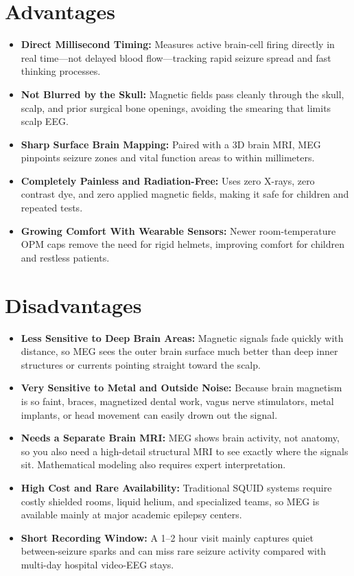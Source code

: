 \section{Advantages}
\begin{itemize}
  \item \textbf{Direct Millisecond Timing:} Measures active brain-cell firing directly in real time---not delayed blood flow---tracking rapid seizure spread and fast thinking processes.
  \item \textbf{Not Blurred by the Skull:} Magnetic fields pass cleanly through the skull, scalp, and prior surgical bone openings, avoiding the smearing that limits scalp EEG.
  \item \textbf{Sharp Surface Brain Mapping:} Paired with a 3D brain MRI, MEG pinpoints seizure zones and vital function areas to within millimeters.
  \item \textbf{Completely Painless and Radiation-Free:} Uses zero X-rays, zero contrast dye, and zero applied magnetic fields, making it safe for children and repeated tests.
  \item \textbf{Growing Comfort With Wearable Sensors:} Newer room-temperature OPM caps remove the need for rigid helmets, improving comfort for children and restless patients.
\end{itemize}

\section{Disadvantages}
\begin{itemize}
  \item \textbf{Less Sensitive to Deep Brain Areas:} Magnetic signals fade quickly with distance, so MEG sees the outer brain surface much better than deep inner structures or currents pointing straight toward the scalp.
  \item \textbf{Very Sensitive to Metal and Outside Noise:} Because brain magnetism is so faint, braces, magnetized dental work, vagus nerve stimulators, metal implants, or head movement can easily drown out the signal.
  \item \textbf{Needs a Separate Brain MRI:} MEG shows brain activity, not anatomy, so you also need a high-detail structural MRI to see exactly where the signals sit. Mathematical modeling also requires expert interpretation.
  \item \textbf{High Cost and Rare Availability:} Traditional SQUID systems require costly shielded rooms, liquid helium, and specialized teams, so MEG is available mainly at major academic epilepsy centers.
  \item \textbf{Short Recording Window:} A 1--2 hour visit mainly captures quiet between-seizure sparks and can miss rare seizure activity compared with multi-day hospital video-EEG stays.
\end{itemize}

